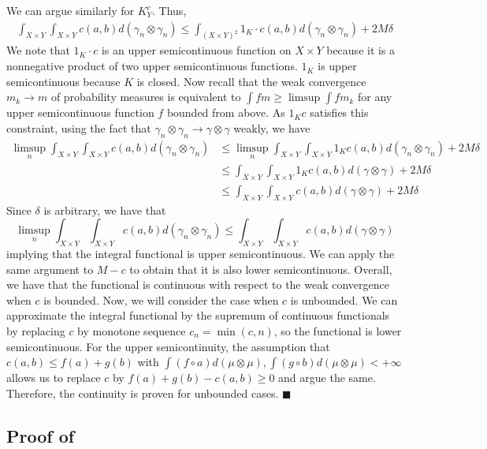 \documentclass[twoside,11pt]{article}
\theoremstyle{definition}
\begin{document}
    We can argue similarly for $K_Y^c$. Thus,
    \begin{align}
        \int_{X\times Y}\int_{X\times Y}c(a,b)d(\gamma_n\otimes \gamma_n) \leq \int_{(X\times Y)^2}1_{K}\cdot c(a,b)d(\gamma_n\otimes \gamma_n) + 2M\delta
    \end{align}
    We note that $1_{K}\cdot c$ is an upper semicontinuous function on $X\times Y$ because it is a nonnegative product of two upper semicontinuous functions. $1_K$ is upper semicontinuous because $K$ is closed. Now recall that the weak convergence $m_k\to m$ of probability measures is equivalent to $\int fm \geq \limsup \int f m_k$ for any upper semicontinuous function $f$ bounded from above. As $1_K c$ satisfies this constraint, using the fact that $\gamma_n \otimes \gamma_n \to \gamma \otimes \gamma $ weakly, we have
    \begin{align}
        \limsup_{n}\int_{X\times Y}\int_{X\times Y}c(a,b)d(\gamma_n\otimes \gamma_n) & \leq  \limsup_{n}\int_{X\times Y}\int_{X\times Y}1_{K}c(a,b)d(\gamma_n\otimes \gamma_n) +2M\delta \\ &\leq \int_{X\times Y}\int_{X\times Y}1_{K}c(a,b)d(\gamma\otimes \gamma) +2M\delta\\ &\leq \int_{X\times Y}\int_{X\times Y}c(a,b)d(\gamma\otimes \gamma) + 2M \delta
    \end{align}
    Since $\delta$ is arbitrary, we have that
    \begin{equation}
        \limsup_{n}\int_{X\times Y}\int_{X\times Y}c(a,b)d(\gamma_n\otimes \gamma_n) \leq \int_{X\times Y}\int_{X\times Y}c(a,b)d(\gamma\otimes \gamma)
    \end{equation}
    implying that the integral functional is upper semicontinuous. We can apply the same argument to $M-c$ to obtain that it is also lower semicontinuous. Overall, we have that the functional is continuous with respect to the weak convergence when $c$ is bounded. Now, we will consider the case when $c$ is unbounded. We can approximate the integral functional by the supremum of continuous functionals by replacing $c$ by monotone sequence $c_n = \min(c,n)$, so the functional is lower semicontinuous. For the upper semicontinuity, the assumption that $c(a,b)\leq f(a)+g(b)$ with $\int (f\circ a)d(\mu\otimes \mu), \int (g\circ b)d(\mu\otimes \mu)<+\infty$ allows us to replace $c$ by $f(a)+g(b)-c(a,b)\geq 0$ and argue the same. Therefore, the continuity is proven for unbounded cases. 
    \hfill $\blacksquare$


\subsection{Proof of \texorpdfstring{}{Lemma \ref{lem:one_point_Holder}}}\label{app:one_point_Holder}
\end{document}
